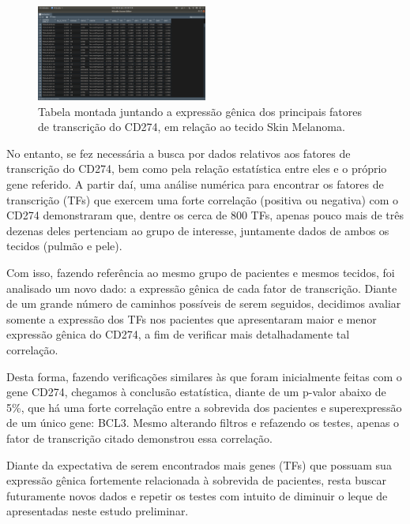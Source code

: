 \documentclass[a4paper,12pt]{article}
\begin{document}
\begin{figure}[h!]
\centering
\includegraphics[width=0.5\textwidth]{SkinExpGen.png}
\caption{Tabela montada juntando a expressão gênica dos principais fatores de transcrição do CD274, em relação ao tecido Skin Melanoma.}
\label{fig:TesteNorm}
\end{figure}

No entanto, se fez necessária a busca por dados relativos aos fatores de transcrição do CD274, bem como pela relação estatística entre eles e o próprio gene referido. A partir daí, uma análise numérica para encontrar os fatores de transcrição (TFs) que exercem uma forte correlação (positiva ou negativa) com o CD274 demonstraram que, dentre os cerca de 800 TFs, apenas pouco mais de três dezenas deles pertenciam ao grupo de interesse, juntamente dados de ambos os tecidos (pulmão e pele).


Com isso, fazendo referência ao mesmo grupo de pacientes e mesmos tecidos, foi analisado um novo dado: a expressão gênica de cada fator de transcrição. Diante de um grande número de caminhos possíveis de serem seguidos, decidimos avaliar somente a expressão dos TFs nos pacientes que apresentaram maior e menor expressão gênica do CD274, a fim de verificar mais detalhadamente tal correlação.

Desta forma, fazendo verificações similares às que foram inicialmente feitas com o gene CD274, chegamos à conclusão estatística, diante de um p-valor abaixo de 5\%, que há uma forte correlação entre a sobrevida dos pacientes e superexpressão de um único gene: BCL3. Mesmo alterando filtros e refazendo os testes, apenas o fator de transcrição citado demonstrou essa correlação. 

Diante da expectativa de serem encontrados mais genes (TFs) que possuam sua expressão gênica fortemente relacionada à sobrevida de pacientes, resta buscar futuramente novos dados e repetir os testes com intuito de diminuir o leque de apresentadas neste estudo preliminar. 
\end{document}
